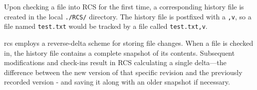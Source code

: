Upon checking a file into RCS for the first time, a corresponding history file is created in the local \lstinline{./RCS/} directory. The history file is postfixed with a \lstinline{,v}, so a file named \lstinline{test.txt} would be tracked by a file called \lstinline{test.txt,v}\cite{stopak_2019}.
\smallskip

\acrshort{rcs} employs a reverse-delta scheme for storing file changes. When a file is checked in, the history file contains a complete snapshot of its contents. Subsequent modifications and check-ins result in RCS calculating a single delta—the difference between the new version of that specific revision and the previously recorded version - and saving it along with an older snapshot if necessary.







